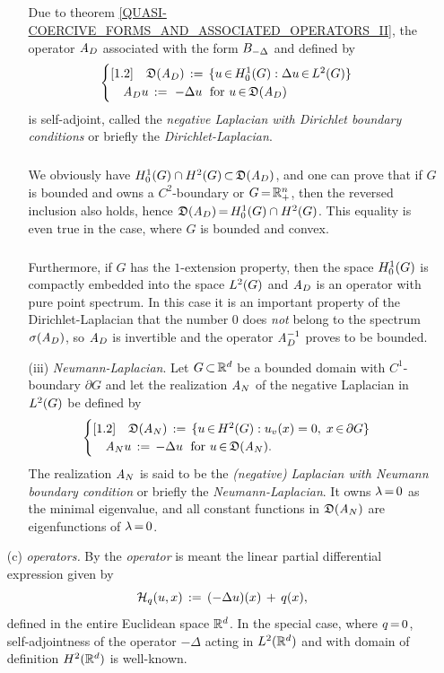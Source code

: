 \documentclass[11pt,twoside]{article}
\def\G{G}
\begin{document}
\begin{itemize}[leftmargin=9mm]
\begin{itemize}[leftmargin=5mm]
\subparagraph{}
Due to theorem \ref{QUASI-COERCIVE_FORMS_AND_ASSOCIATED_OPERATORS_II},
the operator $\linA_D$ associated with the form $\DF_{-\Delta}$
and defined by
\[
\begin{cases}[1.2]
\quad \domain{\linA_D} \eqdef
\{u \xeof \HN{1}{\G}: \Delta u \xeof L^2(\G)\} \\
\quad \linA_D u \eqdef \, - \Delta u \; \for u \xeof \domain{\linA_D} \\
\end{cases}
\] 
is self-adjoint,
called the \textit{negative Laplacian with Dirichlet boundary conditions}
or briefly the \textit{Dirichlet-Laplacian}.

\subparagraph{}
We obviously have
$\HN{1}{\G} \cap H^2(\G) \xsubset \domain{\linA_D}$,
and one can prove that
if $\G$ is bounded and owns a $C^2$-boundary or $\G \eq \R_+^n$,
then the reversed inclusion also holds,
hence $\domain{\linA_D} \eq \HN{1}{\G} \cap H^2(\G)$.
This equality is even true in the case,
where $\G$ is bounded and convex.

\subparagraph{}
Furthermore,
if $\G$ has the $1$-extension property,
then the space $\HN{1}{\G}$ is compactly embedded into the space $\Lh$
and $\linA_D$ is an operator with pure point spectrum.
In this case it is an important property of the Dirichlet-Laplacian
that the number $0$ does \textit{not} belong to the spectrum $\sigma(\linA_D)$,
so $\linA_D$ is invertible and the operator $\linA_D^{-1}$ proves to be bounded.

\item[(iii)]
\textit{Neumann-Laplacian}.
Let $\G \xsubset \Rd$ be a bounded domain with $C^1$-boundary $\partial \G$
and let the realization $\linA_N$ of the negative Laplacian in $\Lh$
be defined by
\[
\begin{cases}[1.2]
\quad \domain{\linA_N} \eqdef
\{ u \xeof H^2(\G): u_v(x)= 0, \; x \xeof \partial \G \} \\
\quad \linA_N u \eqdef - \Delta u \; \for u \xeof \domain{\linA_N}. \\
\end{cases}
\]
The realization $\linA_N$ is said to be the
\textit{(negative) Laplacian with Neumann boundary condition}
or briefly the \textit{Neumann-Laplacian}.
It owns $\lambda \eq 0$ as the minimal eigen\-value,
and all constant functions in $\domain{\linA_N}$ are eigen\-functions
of $\lambda \eq 0$.
\end{itemize}

\item[(c)] \textit{{\SCHROEDINGER} operators.}
By the \textit{{\SCHROEDINGER} operator} is meant
the linear partial differential expression given by
\[
{\mathcal{H}}_q(u,x) \,:=\, (-\Delta u)(x) \,+\, q(x),
\]
defined in the entire Euclidean space ${\mathbb{R}}^d$.
In the special case,
where $q {\,=\,} 0$,
self-adjointness of the operator $-\Delta$ acting in $L^2({\mathbb{R}}^d)$
and with domain of definition $H^2({\mathbb{R}}^d)$ is well-known.


\end{itemize}
\end{document}
